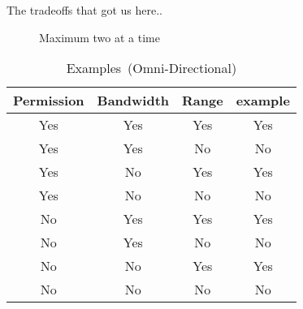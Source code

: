 \documentclass{beamer}
\newcommand{\mydiv}[4]{
  \divider{#1}{#2} (#1-rh.n) node[above] {$#3$}
  (#1-rl.n) node[right] {$#4$} (#1-out)
}
\begin{document}
\begin{frame}{The tradeoffs that got us here..}


  \vspace{-2cm} %

  \begin{minipage}[t]{0.45\textwidth} %

\begin{figure}
  \caption{Maximum two at a time}
\end{figure}


\begin{table}[htbp]
  \centering
  \caption{\mbox{Examples (Omni-Directional)}}
  \begin{tabular}{|c|c|c|c|}
    \hline
    \textbf{Permission} & \textbf{Bandwidth} & \textbf{Range} & \textbf{example} \\
    \hline
    Yes & Yes & Yes & Yes \\
    \hline
    Yes & Yes & No & No \\
    \hline
    Yes & No & Yes & Yes \\
    \hline
    Yes & No & No & No \\
    \hline
    No & Yes & Yes & Yes \\
    \hline
    No & Yes & No & No \\
    \hline
    No & No & Yes & Yes \\
    \hline
    No & No & No & No \\
    \hline
  \end{tabular}
\end{table}



\end{minipage}
\end{frame}
\end{document}

